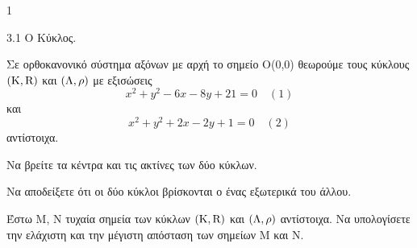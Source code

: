 \begin{ylh}{1}
    \item 3.1 Ο Κύκλος.
\end{ylh}
Σε ορθοκανονικό σύστημα αξόνων με αρχή το σημείο O(0,0) θεωρούμε τους κύκλους $({\rm K}, {\rm R})$ και $({\rm \Lambda}, \rho)$ με εξισώσεις
\[ x^2 + y^2 - 6x - 8y + 21 = 0 \quad (1) \]
και
\[ x^2 + y^2 + 2x - 2y + 1 = 0 \quad (2) \]
αντίστοιχα.

\begin{alist}
\item Να βρείτε τα κέντρα και τις ακτίνες των δύο κύκλων. 
\item Να αποδείξετε ότι οι δύο κύκλοι βρίσκονται ο ένας εξωτερικά του άλλου. 
\item Έστω M, N τυχαία σημεία των κύκλων $({\rm K}, {\rm R})$ και $({\rm \Lambda}, \rho)$ αντίστοιχα. Να υπολογίσετε την ελάχιστη και την μέγιστη απόσταση των σημείων M και N. 
\end{alist}